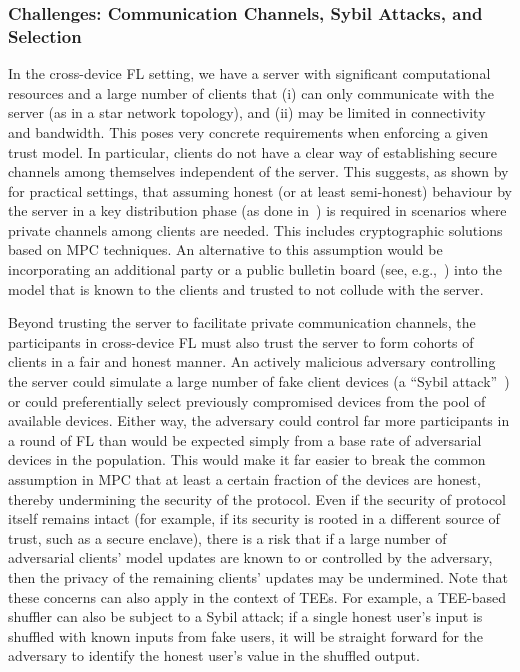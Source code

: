 \documentclass[11pt]{article}
\begin{document}
\subsubsection{Challenges: Communication Channels, Sybil Attacks, and Selection}
\label{sssec:challenges}

In the cross-device FL setting, we have a server with significant computational resources and a large number of clients that (i) can only communicate with the server (as in a star network topology), and (ii) may be limited in connectivity and bandwidth. This poses very concrete requirements when enforcing a given trust model. In particular, clients do not have a clear way of establishing secure channels among themselves independent of the server. This suggests, as shown by \citet{hatelove} for practical settings, that assuming honest (or at least semi-honest) behaviour by the server in a key distribution phase (as done in~\cite{bonawitz17secagg, bell20secagg}) is required in scenarios where private channels among clients are needed. This includes cryptographic solutions based on MPC techniques. An alternative to this assumption would be incorporating an additional party or a public bulletin board (see, e.g.,~\cite{DBLP:conf/sosp/RothNFH19}) into the model that is known to the clients and trusted to not collude with the server. 

Beyond trusting the server to facilitate private communication channels, the participants in cross-device FL must also trust the server to form cohorts of clients in a fair and honest manner.  An actively malicious adversary controlling the server could simulate a large number of fake client devices (a ``Sybil attack''~\cite{sybil-attack}) or could preferentially select previously compromised devices from the pool of available devices.   Either way, the adversary could control far more participants in a round of FL than would be expected simply from a base rate of adversarial devices in the population.  This would make it far easier to break the common assumption in MPC that at least a certain fraction of the devices are honest, thereby undermining the security of the protocol. Even if the security of protocol itself remains intact (for example, if its security is rooted in a different source of trust, such as a secure enclave), there is a risk that if a large number of adversarial clients' model updates are known to or controlled by the adversary, then the privacy of the remaining clients' updates may be undermined.  Note that these concerns can also apply in the context of TEEs.  For example, a TEE-based shuffler can also be subject to a Sybil attack; if a single honest user's input is shuffled with known inputs from fake users, it will be straight forward for the adversary to identify the honest user's value in the shuffled output.
\end{document}
